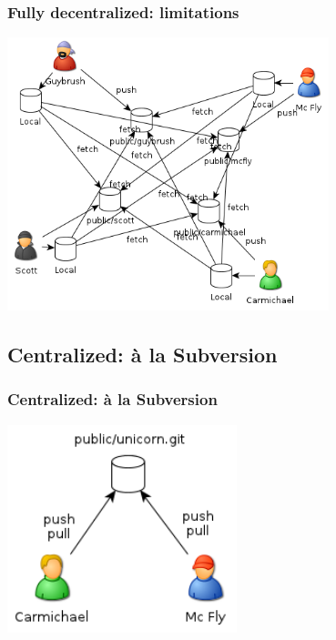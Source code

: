 \documentclass{beamer}
\begin{document}
    \begin{frame}
        \frametitle{Fully decentralized: limitations}
        \begin{center}
            \includegraphics[width=0.7\textwidth]{./figures/decent-wf-fail.png}
        \end{center}

    \end{frame}

        \subsection{Centralized: à la Subversion}

    \begin{frame}
        \frametitle{Centralized: à la Subversion}
        \begin{center}
            \includegraphics[width=0.5\textwidth]{./figures/svnstyle.png}
        \end{center}
    \end{frame}
\end{document}
